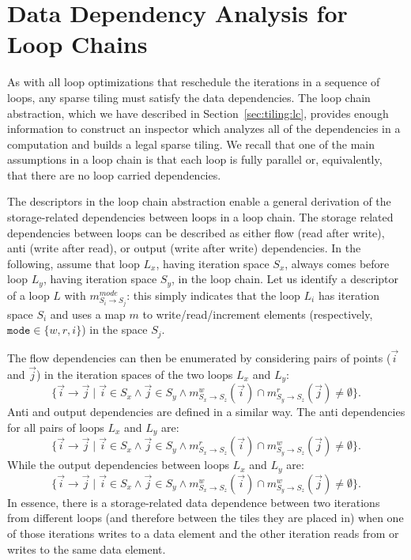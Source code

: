 \section{Data Dependency Analysis for Loop Chains}

As with all loop optimizations that reschedule the iterations in a sequence of loops, any sparse tiling must satisfy the data dependencies. The loop chain abstraction, which we have described in Section~\ref{sec:tiling:lc}, provides enough information to construct an inspector which analyzes all of the dependencies in a computation and builds a legal sparse tiling. We recall that one of the main assumptions in a loop chain is that each loop is fully parallel or, equivalently, that there are no loop carried dependencies.

The descriptors in the loop chain abstraction enable a general derivation of the storage-related dependencies between loops in a loop chain. The storage related dependencies between loops can be described as either flow (read after write), anti (write after read), or output (write after write) dependencies. In the following, assume that loop $L_x$, having iteration space $S_x$, always comes before loop $L_y$, having iteration space $S_y$, in the loop chain. Let us identify a descriptor of a loop $L$ with $m_{S_i \rightarrow S_j}^{mode}$: this simply indicates that the loop $L_i$ has iteration space $S_i$ and uses a map $m$ to write/read/increment elements (respectively, $\texttt{mode} \in \lbrace w, r, i\rbrace$) in the space $S_j$.

The flow dependencies can then be enumerated by considering pairs of points ($\vec{i}$ and $\vec{j}$) in the iteration spaces of the two loops $L_x$ and $L_y$:
\[
	\{ \vec{i} \rightarrow \vec{j} \; | \; \vec{i} \in S_x \wedge \vec{j} \in S_y \wedge 
	m_{S_x\rightarrow S_z}^{w}(\vec{i}) \cap m_{S_y \rightarrow S_z}^{r}(\vec{j}) \ne \emptyset \}.
\]
Anti and output dependencies are defined in a similar way. The anti dependencies for all pairs of loops $L_x$ and $L_y$ are:
\[
	\{ \vec{i} \rightarrow \vec{j} \; | \; \vec{i} \in S_x \wedge \vec{j} \in S_y \wedge 
	m_{S_x\rightarrow S_z}^{r}(\vec{i}) \cap m_{S_y \rightarrow S_z}^{w}(\vec{j}) \ne \emptyset \}.
\]
While the output dependencies between loops $L_x$ and $L_y$ are:
\[
	\{ \vec{i} \rightarrow \vec{j} \; | \; \vec{i} \in S_x \wedge \vec{j} \in S_y \wedge 
	m_{S_x\rightarrow S_z}^{w}(\vec{i}) \cap m_{S_y \rightarrow S_z}^{w}(\vec{j}) \ne \emptyset \}.
\]
In essence, there is a storage-related data dependence between two iterations from different loops (and therefore between the tiles they are placed in) when one of those iterations writes to a data element and the other iteration reads from or writes to the same data element.

